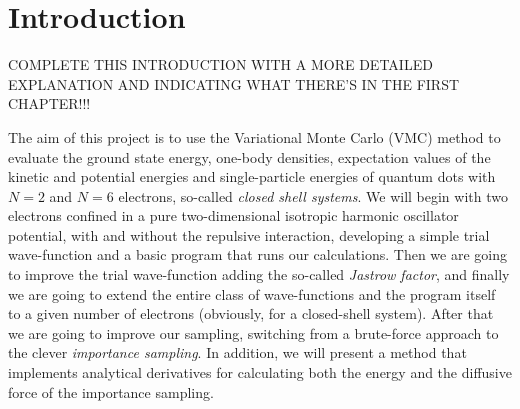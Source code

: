
\chapter{Introduction}
COMPLETE THIS INTRODUCTION WITH A MORE DETAILED EXPLANATION AND INDICATING WHAT THERE'S IN THE FIRST CHAPTER!!!

The aim of this project is to use the Variational Monte Carlo (VMC) 
method to evaluate the ground state energy, one-body densities, 
expectation values of the kinetic and potential energies and 
single-particle energies of quantum dots with $N = 2$ and $N = 6$ 
electrons, so-called \emph{closed shell systems}. We will begin with 
two electrons confined in a pure two-dimensional isotropic harmonic 
oscillator potential, with and without the repulsive interaction, developing
a simple trial wave-function and a basic program that runs our calculations.
Then we are going to improve the trial wave-function adding the so-called 
\emph{Jastrow factor}, and finally we are going to extend the entire class of
wave-functions and the program itself to a given number of electrons 
(obviously, for a closed-shell system). After that we are going to improve
our sampling, switching from a brute-force approach to the clever
\emph{importance sampling}. In addition, we will present a method that 
implements analytical derivatives for calculating both the energy and the
diffusive force of the importance sampling.			
